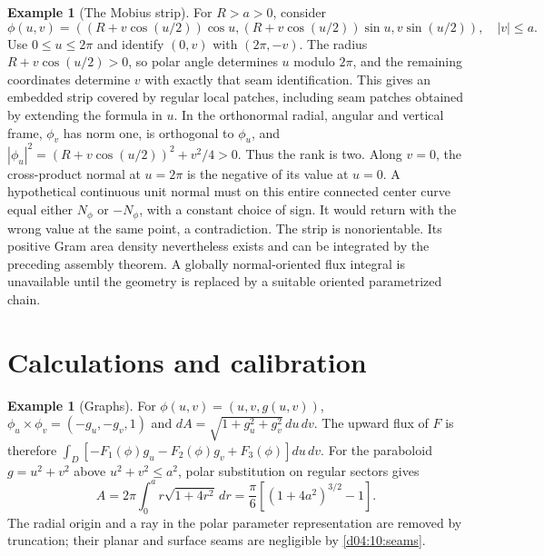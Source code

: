 \documentclass[11pt,oneside,openany]{book}
\theoremstyle{definition}
\newtheorem{example}[theorem]{Example}
\theoremstyle{remark}
\newcommand{\family}[1]{}
\begin{document}
\begin{example}[The Mobius strip]\label{d04:10:mobius}
For $R>a>0$, consider
\[
 \phi(u,v)=((R+v\cos(u/2))\cos u,
 (R+v\cos(u/2))\sin u,v\sin(u/2)),\quad |v|\le a.
\]
Use $0\le u\le2\pi$ and identify $(0,v)$ with $(2\pi,-v)$.
The radius $R+v\cos(u/2)>0$, so polar angle determines $u$ modulo $2\pi$,
and the remaining coordinates determine $v$ with exactly that seam
identification. This gives an embedded strip covered by regular local
patches, including seam patches obtained by extending the formula in $u$.
In the orthonormal radial, angular and vertical frame, $\phi_v$ has norm
one, is orthogonal to $\phi_u$, and
$|\phi_u|^2=(R+v\cos(u/2))^2+v^2/4>0$. Thus the rank is two.
Along $v=0$, the cross-product normal at $u=2\pi$ is the negative of its
value at $u=0$. A hypothetical continuous unit normal must on this entire
connected center curve equal either $N_\phi$ or $-N_\phi$, with a constant
choice of sign. It would return with the wrong value at the same point,
a contradiction. The strip is nonorientable. Its positive Gram area
density nevertheless exists and can be integrated by the preceding
assembly theorem. A globally normal-oriented flux integral is unavailable
until the geometry is replaced by a suitable oriented parametrized chain.
\end{example}

\section{Calculations and calibration}
\family{K04.10.10}
\begin{example}[Graphs]\label{d04:10:graph}
For $\phi(u,v)=(u,v,g(u,v))$,
$\phi_u\times\phi_v=(-g_u,-g_v,1)$ and
$dA=\sqrt{1+g_u^2+g_v^2}\,du\,dv$.
The upward flux of $F$ is therefore
$\int_D[-F_1(\phi)g_u-F_2(\phi)g_v+F_3(\phi)]du\,dv$.
For the paraboloid $g=u^2+v^2$ above $u^2+v^2\le a^2$,
polar substitution on regular sectors gives
\[
 A=2\pi\int_0^a r\sqrt{1+4r^2}\,dr
   =\frac\pi6[(1+4a^2)^{3/2}-1].
\]
The radial origin and a ray in the polar parameter representation are
removed by truncation; their planar and surface seams are negligible by
\cref{d04:10:seams}.
\end{example}
\end{document}
